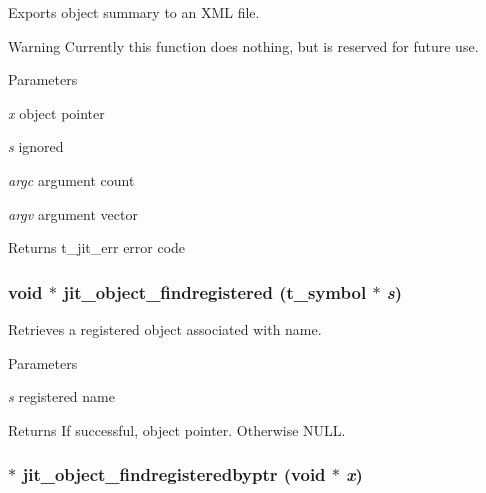 Exports object summary to an XML file. \begin{DoxyWarning}{Warning}
Currently this function does nothing, but is reserved for future use.
\end{DoxyWarning}

\begin{DoxyParams}{Parameters}
\item[{\em x}]object pointer \item[{\em s}]ignored \item[{\em argc}]argument count \item[{\em argv}]argument vector\end{DoxyParams}
\begin{DoxyReturn}{Returns}
t\_\-jit\_\-err error code 
\end{DoxyReturn}
\hypertarget{group__objectmod_ga328c0beb469f32437b756852fe8583bf}{
\subsubsection[{jit\_\-object\_\-findregistered}]{\setlength{\rightskip}{0pt plus 5cm}void $\ast$ jit\_\-object\_\-findregistered ({\bf t\_\-symbol} $\ast$ {\em s})}}
\label{group__objectmod_ga328c0beb469f32437b756852fe8583bf}


Retrieves a registered object associated with name. 
\begin{DoxyParams}{Parameters}
\item[{\em s}]registered name\end{DoxyParams}
\begin{DoxyReturn}{Returns}
If successful, object pointer. Otherwise NULL. 
\end{DoxyReturn}
\hypertarget{group__objectmod_gaf59274b20cbf6a44cc4269a0a4165745}{
\subsubsection[{jit\_\-object\_\-findregisteredbyptr}]{$\ast$ jit\_\-object\_\-findregisteredbyptr (void $\ast$ {\em x})}}
\label{group__objectmod_gaf59274b20cbf6a44cc4269a0a4165745}



